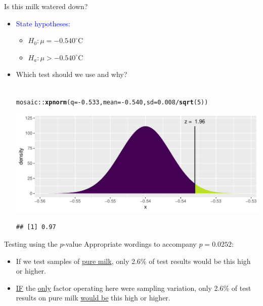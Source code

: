 \documentclass[10pt]{beamer}\usepackage[]{graphicx}\usepackage[]{color}
\makeatletter
\def\maxwidth{ %
  \ifdim\Gin@nat@width>\linewidth
    \linewidth
  \else
    \Gin@nat@width
  \fi
}
\newcommand{\hlnum}[1]{\textcolor[rgb]{0.686,0.059,0.569}{#1}}%
\newcommand{\hlopt}[1]{\textcolor[rgb]{0,0,0}{#1}}%
\newcommand{\hlstd}[1]{\textcolor[rgb]{0.345,0.345,0.345}{#1}}%
\newcommand{\hlkwc}[1]{\textcolor[rgb]{0.333,0.667,0.333}{#1}}%
\newcommand{\hlkwd}[1]{\textcolor[rgb]{0.737,0.353,0.396}{\textbf{#1}}}%
\newenvironment{kframe}{%
 \def\at@end@of@kframe{}%
 \ifinner\ifhmode%
  \def\at@end@of@kframe{\end{minipage}}%
  \begin{minipage}{\columnwidth}%
 \fi\fi%
 \def\FrameCommand##1{\hskip\@totalleftmargin \hskip-\fboxsep
 \colorbox{shadecolor}{##1}\hskip-\fboxsep
     \hskip-\linewidth \hskip-\@totalleftmargin \hskip\columnwidth}%
 \MakeFramed {\advance\hsize-\width
   \@totalleftmargin\z@ \linewidth\hsize
   \@setminipage}}%
 {\par\unskip\endMakeFramed%
 \at@end@of@kframe}
\newenvironment{knitrout}{}{} %
\newcommand{\blue}[1]{\textcolor{blue}{#1}}
\makeatother
\begin{document}
\begin{frame}[fragile]{Is this milk watered down?}
	\begin{itemize}
		\setlength\itemsep{.7em}
		\item \blue{State hypotheses:} \pause \begin{itemize}
			\item $H_0: \mu =  -0.540^{\circ}$C \pause
			\item  $H_a: \mu >  -0.540^{\circ}$C
		\end{itemize}
		\item Which test should we use and why? \pause \\ \ \\
		
		
\begin{knitrout}\tiny
{}\color{fgcolor}\begin{kframe}
\begin{alltt}
\hlstd{mosaic}\hlopt{::}\hlkwd{xpnorm}\hlstd{(}\hlkwc{q} \hlstd{=} \hlopt{-}\hlnum{0.533}\hlstd{,} \hlkwc{mean} \hlstd{=} \hlopt{-}\hlnum{0.540}\hlstd{,} \hlkwc{sd} \hlstd{=} \hlnum{0.008}\hlopt{/}\hlkwd{sqrt}\hlstd{(}\hlnum{5}\hlstd{))}
\end{alltt}
\end{kframe}

{\centering \includegraphics[width=\maxwidth]{figure/unnamed-chunk-1-1} 

}


\begin{kframe}\begin{verbatim}
## [1] 0.97
\end{verbatim}
\end{kframe}
\end{knitrout}
		
	\end{itemize}
\end{frame}

\begin{frame}[fragile]{Testing using the $p$-value}
	Appropriate wordings to accompany $p=0.0252$:
	\begin{itemize}
		\setlength\itemsep{1.5em}
		\item If we test samples of \underline{pure milk}, only 2.6\% of test results would be this high or higher.
		\pause 
		\item \underline{IF} the \underline{only} factor operating here were sampling variation, only  2.6\% of test results on pure milk  \underline{would be} this high or higher.
	\end{itemize}
	
\end{frame}
\end{document}
